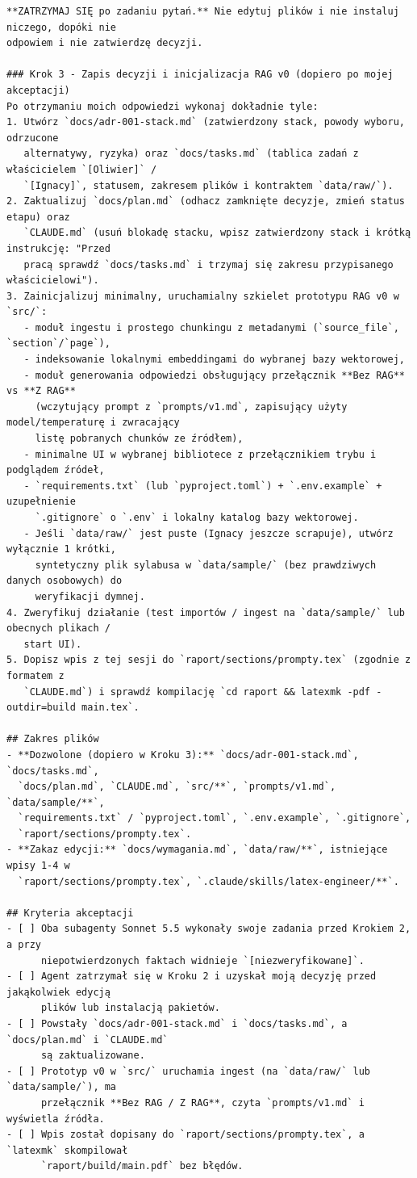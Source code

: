 \begin{lstlisting}
**ZATRZYMAJ SIĘ po zadaniu pytań.** Nie edytuj plików i nie instaluj niczego, dopóki nie
odpowiem i nie zatwierdzę decyzji.

### Krok 3 - Zapis decyzji i inicjalizacja RAG v0 (dopiero po mojej akceptacji)
Po otrzymaniu moich odpowiedzi wykonaj dokładnie tyle:
1. Utwórz `docs/adr-001-stack.md` (zatwierdzony stack, powody wyboru, odrzucone
   alternatywy, ryzyka) oraz `docs/tasks.md` (tablica zadań z właścicielem `[Oliwier]` /
   `[Ignacy]`, statusem, zakresem plików i kontraktem `data/raw/`).
2. Zaktualizuj `docs/plan.md` (odhacz zamknięte decyzje, zmień status etapu) oraz
   `CLAUDE.md` (usuń blokadę stacku, wpisz zatwierdzony stack i krótką instrukcję: "Przed
   pracą sprawdź `docs/tasks.md` i trzymaj się zakresu przypisanego właścicielowi").
3. Zainicjalizuj minimalny, uruchamialny szkielet prototypu RAG v0 w `src/`:
   - moduł ingestu i prostego chunkingu z metadanymi (`source_file`, `section`/`page`),
   - indeksowanie lokalnymi embeddingami do wybranej bazy wektorowej,
   - moduł generowania odpowiedzi obsługujący przełącznik **Bez RAG** vs **Z RAG**
     (wczytujący prompt z `prompts/v1.md`, zapisujący użyty model/temperaturę i zwracający
     listę pobranych chunków ze źródłem),
   - minimalne UI w wybranej bibliotece z przełącznikiem trybu i podglądem źródeł,
   - `requirements.txt` (lub `pyproject.toml`) + `.env.example` + uzupełnienie
     `.gitignore` o `.env` i lokalny katalog bazy wektorowej.
   - Jeśli `data/raw/` jest puste (Ignacy jeszcze scrapuje), utwórz wyłącznie 1 krótki,
     syntetyczny plik sylabusa w `data/sample/` (bez prawdziwych danych osobowych) do
     weryfikacji dymnej.
4. Zweryfikuj działanie (test importów / ingest na `data/sample/` lub obecnych plikach /
   start UI).
5. Dopisz wpis z tej sesji do `raport/sections/prompty.tex` (zgodnie z formatem z
   `CLAUDE.md`) i sprawdź kompilację `cd raport && latexmk -pdf -outdir=build main.tex`.

## Zakres plików
- **Dozwolone (dopiero w Kroku 3):** `docs/adr-001-stack.md`, `docs/tasks.md`,
  `docs/plan.md`, `CLAUDE.md`, `src/**`, `prompts/v1.md`, `data/sample/**`,
  `requirements.txt` / `pyproject.toml`, `.env.example`, `.gitignore`,
  `raport/sections/prompty.tex`.
- **Zakaz edycji:** `docs/wymagania.md`, `data/raw/**`, istniejące wpisy 1-4 w
  `raport/sections/prompty.tex`, `.claude/skills/latex-engineer/**`.

## Kryteria akceptacji
- [ ] Oba subagenty Sonnet 5.5 wykonały swoje zadania przed Krokiem 2, a przy
      niepotwierdzonych faktach widnieje `[niezweryfikowane]`.
- [ ] Agent zatrzymał się w Kroku 2 i uzyskał moją decyzję przed jakąkolwiek edycją
      plików lub instalacją pakietów.
- [ ] Powstały `docs/adr-001-stack.md` i `docs/tasks.md`, a `docs/plan.md` i `CLAUDE.md`
      są zaktualizowane.
- [ ] Prototyp v0 w `src/` uruchamia ingest (na `data/raw/` lub `data/sample/`), ma
      przełącznik **Bez RAG / Z RAG**, czyta `prompts/v1.md` i wyświetla źródła.
- [ ] Wpis został dopisany do `raport/sections/prompty.tex`, a `latexmk` skompilował
      `raport/build/main.pdf` bez błędów.


\end{lstlisting}
